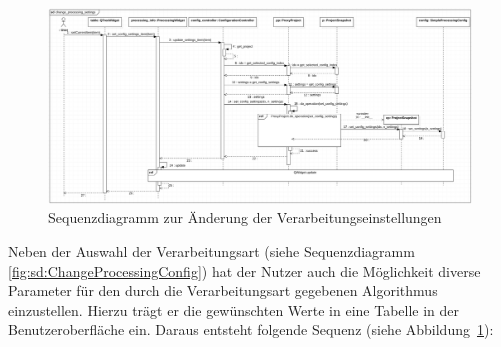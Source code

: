 \documentclass{article}
\begin{document}
\begin{figure}[H]%
    \centering
    \includegraphics[width=13cm]{docs/entwurf/Entwurf_dokument/img/Michael/sd_change_processing_settings.png}
    \caption{Sequenzdiagramm zur Änderung der Verarbeitungseinstellungen}
    \label{fig:sd:ChangeProcessingSettings}
\end{figure}

Neben der Auswahl der Verarbeitungsart (siehe Sequenzdiagramm \ref{fig:sd:ChangeProcessingConfig}) hat der Nutzer auch die Möglichkeit diverse Parameter für den durch die Verarbeitungsart gegebenen Algorithmus einzustellen. Hierzu trägt er die gewünschten Werte in eine Tabelle in der Benutzeroberfläche ein. Daraus entsteht folgende Sequenz (siehe Abbildung~\ref{fig:sd:ChangeProcessingSettings}):
\end{document}

